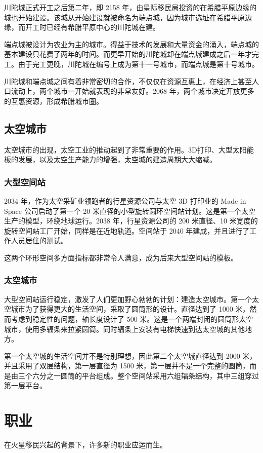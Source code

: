 \documentclass[letterpaper,10pt]{sphinxmanual}
\begin{document}
川陀城正式开工之后第二年，即 2158 年，由星际移民局投资的在希腊平原边缘的城也开始建设。该城从开始建设就被命名为端点城，因为城市选址在希腊平原边缘，而开工时已经有希腊平原中心的川陀城在建。

端点城被设计为农业为主的城市。得益于技术的发展和大量资金的涌入，端点城的基本建设只花费了两年的时间。而更早开始的川陀城却在端点城建成之后一年才完工。由于完工更晚，川陀城在编号上成为第十一号城市，而端点城是第十号城市。

川陀城和端点城之间有着非常密切的合作，不仅仅在资源互惠上，在经济上甚至人口流动上，两个城市一开始就表现的非常友好。2068 年，两个城市决定开放更多的互惠资源，形成希腊城市圈。


\subsection{太空城市}
\label{cities:id8}
太空城市的出现，太空工业的推动起到了非常重要的作用。3D打印、大型太阳能板的发展，以及太空生产能力的增强，太空城的建造周期大大缩减。


\subsubsection{大型空间站}
\label{cities:id9}
2034 年，作为太空采矿业领跑者的行星资源公司与太空 3D 打印业的 Made in Space 公司启动了第一个 20 米直径的小型旋转圆环空间站计划。这是第一个太空生产的模型，环绕地球运行。2038 年，行星资源公司的 200 米直径、10 米宽度的旋转空间站工厂开始，同样是在近地轨道。空间站于 2040 年建成，并且进行了工作人员居住的测试。

这两个环形空间多方面指标都非常令人满意，成为后来大型空间站的模板。


\subsubsection{太空城市}
\label{cities:id10}
大型空间站运行稳定，激发了人们更加野心勃勃的计划：建造太空城市。第一个太空城市为了获得更大的生活空间，采取了圆筒形的设计。直径达到了 1000 米，然而考虑到稳定性的问题，轴长度设计了 500 米。这是一个两端封闭的圆筒形太空城市，使用多辐条来拉紧圆筒。同时辐条上安装有电梯快速到达太空城的其他地方。

第一个太空城的生活空间并不是特别理想，因此第二个太空城直径达到 2000 米，并且采用了双层结构，第一层直径为 1500 米，第一层并不是一个完整的圆筒，而是由三个六分之一圆筒的平台组成。整个空间站采用六组辐条结构，其中三组穿过第一层平台。


\section{职业}
\label{profession::doc}\label{profession:id1}
在火星移民兴起的背景下，许多新的职业应运而生。
\end{document}
